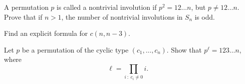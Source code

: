 \documentclass[addpoints]{exam}
\begin{document}
  \pagestyle{headandfoot}
  \runningheadrule

  \firstpagefooter{}{}{}
  \runningfooter{}{}{}
  \begin{flushright}

    \vspace{0.2in}
  \end{flushright}

  \begin{questions}
    \question
      A permutation $p$ is called a nontrivial involution if
			$p^2 = 1 2 \dots n$, but $p \neq 12 \dots n$. Prove that if $n > 1$, the
			number of nontrivial involutions in $S_n$ is odd.

      \begin{solution}[\stretch{1}]
      \end{solution}
      \newpage
    \question
      Find an explicit formula for $c(n, n - 3)$.

      \begin{solution}[\stretch{1}]
      \end{solution}
      \newpage
    \question
      Let $p$ be a permutation of the cyclic type $(c_1, \dots, c_n)$.
			Show that $p^\ell = 1 2 3 \dots n$, where
			\[
			  \ell = \prod_{i ~:~ c_i \neq 0} i.
			\]

      \begin{solution}[\stretch{1}]
      \end{solution}
      \newpage
  \end{questions}
\end{document}
